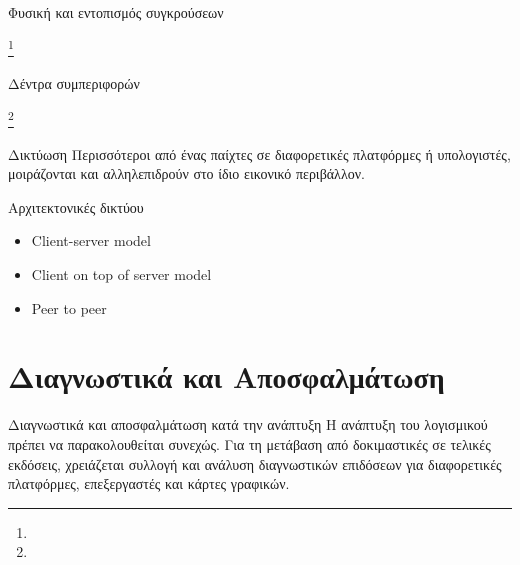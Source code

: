 \documentclass{beamer}
\newcommand\blfootnote[1]{%
	\begingroup
	\renewcommand\thefootnote{}\footnote{#1}%
	\addtocounter{footnote}{-1}%
	\endgroup
}
\begin{document}
	\begin{frame}{Φυσική και εντοπισμός συγκρούσεων}
		\begin{figure}
			\centering
			\resizebox{10.5cm}{!}{}
		\end{figure}
		\blfootnote{}
	\end{frame}
	
	\begin{frame}{Δέντρα συμπεριφορών}
		\begin{figure}
			\centering
			\resizebox{10.5cm}{!}{}
		\end{figure}
		\blfootnote{}
	\end{frame}

	\begin{frame}{Δικτύωση}
		Περισσότεροι από ένας παίχτες σε διαφορετικές πλατφόρμες ή υπολογιστές, μοιράζονται και αλληλεπιδρούν στο ίδιο εικονικό περιβάλλον.
		
		\alert{Αρχιτεκτονικές δικτύου} 		
		\begin{itemize}
			\item Client-server model
			\item Client on top of server model
			\item Peer to peer
		\end{itemize}			
	
	\end{frame}
	
	
	\section{Διαγνωστικά και Αποσφαλμάτωση}
	\begin{frame}{Διαγνωστικά και αποσφαλμάτωση κατά την ανάπτυξη}
		Η ανάπτυξη του λογισμικού πρέπει να παρακολουθείται συνεχώς. 
		\newline 
		\newline 
		Για τη μετάβαση από δοκιμαστικές σε τελικές εκδόσεις, χρειάζεται συλλογή και ανάλυση διαγνωστικών επιδόσεων για διαφορετικές πλατφόρμες, επεξεργαστές και κάρτες γραφικών. 
	\end{frame}
	
\end{document}
